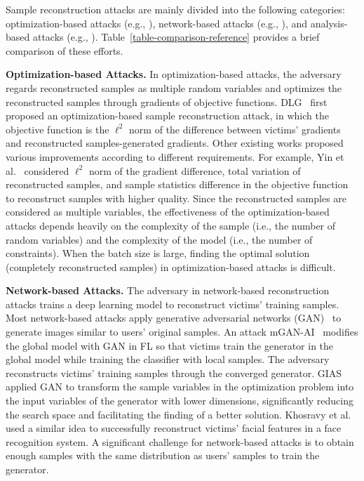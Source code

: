 \documentclass[lettersize,journal]{IEEEtran}
\begin{document}
Sample reconstruction attacks are mainly divided into the following categories: optimization-based attacks (e.g., \cite{Zhu2020DLG, Yang2023compress, Hatamizadeh2022GradViT, Pan2022Exploring}), network-based attacks (e.g., \cite{Song2020Analyzing, jeon2021gradient, Khosravy2022Model, ganev2023inadequacy}), and analysis-based attacks (e.g., \cite{fowl2022robbing, Boenisch2021When, yuan2021beyond}). Table~\ref{table-comparison-reference} provides a brief comparison of these efforts.

\textbf{Optimization-based Attacks.}
In optimization-based attacks, the adversary regards reconstructed samples as multiple random variables and optimizes the reconstructed samples through gradients of objective functions. DLG~\cite{Zhu2020DLG} first proposed an optimization-based sample reconstruction attack, in which the objective function is the $\ell^2$ norm of the difference between victims' gradients and reconstructed samples-generated gradients. Other existing works proposed various improvements according to different requirements. For example, Yin et al.~\cite{Yin2021see} considered $\ell^2$ norm of the gradient difference, total variation of reconstructed samples, and sample statistics difference in the objective function to reconstruct samples with higher quality. Since the reconstructed samples are considered as multiple variables, the effectiveness of the optimization-based attacks depends heavily on the complexity of the sample (i.e., the number of random variables) and the complexity of the model (i.e., the number of constraints). When the batch size is large, finding the optimal solution (completely reconstructed samples) in optimization-based attacks is difficult.

\textbf{Network-based Attacks.}
The adversary in network-based reconstruction attacks trains a deep learning model to reconstruct victims' training samples. Most network-based attacks apply generative adversarial networks (GAN)~\cite{goodfellow2014GAN} to generate images similar to users' original samples. An attack mGAN-AI~\cite{Song2020Analyzing} modifies the global model with GAN in FL so that victims train the generator in the global model while training the classifier with local samples. The adversary reconstructs victims' training samples through the converged generator. GIAS~\cite{jeon2021gradient} applied GAN to transform the sample variables in the optimization problem into the input variables of the generator with lower dimensions, significantly reducing the search space and facilitating the finding of a better solution. Khosravy et al.~\cite{Khosravy2022Model} used a similar idea to successfully reconstruct victims' facial features in a face recognition system. A significant challenge for network-based attacks is to obtain enough samples with the same distribution as users' samples to train the generator.
\end{document}
